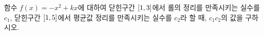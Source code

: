 함수 $f(x)=-x^2+kx$에 대하여 닫힌구간 $[1{,}\mkern3mu\mathopen{}3]$에서 롤의 정리를 만족시키는 실수를 $c_1$, 닫힌구간 $[1{,}\mkern3mu\mathopen{}5]$에서 평균값 정리를 만족시키는 실수를 $c_2$라 할 때, $c_1c_2$의 값을 구하시오. 
